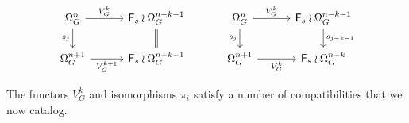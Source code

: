 \documentclass[a4paper,10pt]{article}%
\begin{document}
\begin{remark}
\begin{equation}\label{PIIDEFDI2 EQ}
\begin{tikzcd}[row sep=1.7em,column sep = 3em]
	\Omega_{G}^{n} \ar{d}[swap]{s_{j}} \ar{r}{V_G^k} &
	|[alias=F1]|
	\Fin_s \wr \Omega_{G}^{n-k-1}
	\ar[equal]{d} 
&
	\Omega_{G}^{n} \ar{d}[swap]{s_{j}} \ar{r}{V_G^k} &
	\Fin_s \wr \Omega_{G}^{n-k-1}
	\ar{d}{s_{j-k-1}} 
\\
	|[alias=G2]|
	\Omega_{G}^{n+1} \ar{r}[swap]{V_G^{k+1}}&
	\Fin_s \wr \Omega_{G}^{n-k-1}  
&
	\Omega_{G}^{n+1} \ar{r}[swap]{V_G^{k}}&
	\Fin_s \wr \Omega_{G}^{n-k}  
\end{tikzcd}
\end{equation}
\end{remark}

The functors $V^k_G$ and isomorphisms $\pi_i$ satisfy a number of compatibilities that we now catalog.
\end{document}
